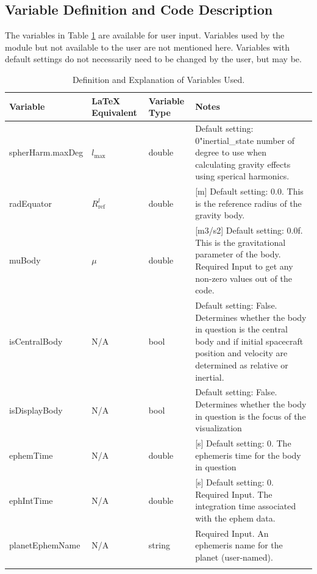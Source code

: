 \subsection{Variable Definition and Code Description}
The variables in Table \ref{tabular:vars} are available for user input. Variables used by the module but not available to the user are not mentioned here. Variables with default settings do not necessarily need to be changed by the user, but may be.
\begin{table}[H]
	\caption{Definition and Explanation of Variables Used.}
	\label{tab:errortol}
	\centering \fontsize{10}{10}\selectfont
	\begin{tabular}{ | m{3cm}| m{3cm} | m{3cm} | m{6cm} |} %
		\hline
		\textbf{Variable}   							& \textbf{LaTeX Equivalent} 	&		\textbf{Variable Type} & \textbf{Notes}			  \\ \hline
		spherHarm.maxDeg					&$l_{\text{max}}$		 	  & double & Default setting: 0"inertial\_state number of degree to use when calculating gravity effects using sperical harmonics.\\ \hline
		radEquator			   & $R_{\mathrm{ref}}^{l}$			& double & [m] Default setting: 0.0. 	This is the reference radius of the gravity body.\\ \hline
		muBody					& $\mu$ 		& double & [m3/s2] Default setting: 0.0f. This is the gravitational parameter of the body. Required Input to get any non-zero values out of the code.\\ \hline
		isCentralBody & N/A & bool & Default setting: False. Determines whether the body in question is the central body and if initial spacecraft position and velocity are determined as relative or inertial.\\ \hline
		isDisplayBody & N/A & bool & Default setting: False. Determines whether the body in question is the focus of the visualization\\ \hline
		ephemTime & N/A & double & [s] Default setting: 0. The ephemeris time for the body in question \\ \hline
		ephIntTime & N/A & double & [s] Default setting: 0. Required Input. The integration time associated with the ephem data. \\ \hline
		planetEphemName & N/A & string & Required Input. An ephemeris name for the planet (user-named). \\ \hline
		\label{tabular:vars}
	\end{tabular}
\end{table}

